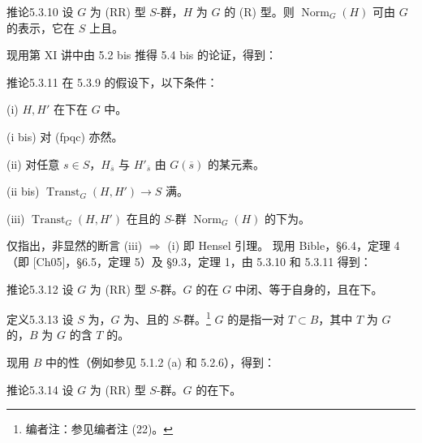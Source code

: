 \begin{SGAresult}{推论}{5.3.10} 设 $G$ 为 (RR) 型 $S$-群，$H$ 为 $G$ 的 (R) 型。则 $\operatorname{Norm}_G(H)$ 可由 $G$ 的表示，它在 $S$ 上且。\end{SGAresult}
现用第 XI 讲中由 5.2 bis 推得 5.4 bis 的论证，得到：
\begin{SGAresult}{推论}{5.3.11} 在 5.3.9 的假设下，以下条件：

(i) $H,H'$ 在下在 $G$ 中。

(i bis) 对 (fpqc) 亦然。

(ii) 对任意 $s\in S$，$H_{\overline s}$ 与 $H'_{\overline s}$ 由 $G(\overline s)$ 的某元素。

(ii bis)  $\operatorname{Transt}_G(H,H')\to S$ 满。

(iii) $\operatorname{Transt}_G(H,H')$ 在且的 $S$-群 $\operatorname{Norm}_G(H)$ 的下为。
\end{SGAresult}
仅指出，非显然的断言 (iii) $\Rightarrow$ (i) 即 Hensel 引理。
现用 Bible，§6.4，定理 4（即 [Ch05]，§6.5，定理 5）及 §9.3，定理 1，由 5.3.10 和 5.3.11 得到：
\begin{SGAresult}{推论}{5.3.12} 设 $G$ 为 (RR) 型 $S$-群。$G$ 的在 $G$ 中闭、等于自身的，且在下。\end{SGAresult}
\begin{SGAresult}{定义}{5.3.13} 设 $S$ 为，$G$ 为、且的 $S$-群。\footnote{编者注：参见编者注 (22)。} $G$ 的是指一对 $T\subset B$，其中 $T$ 为 $G$ 的，$B$ 为 $G$ 的含 $T$ 的。\end{SGAresult}
现用 $B$ 中的性（例如参见 5.1.2 (a) 和 5.2.6），得到：
\begin{SGAresult}{推论}{5.3.14} 设 $G$ 为 (RR) 型 $S$-群。$G$ 的在下。\end{SGAresult}
